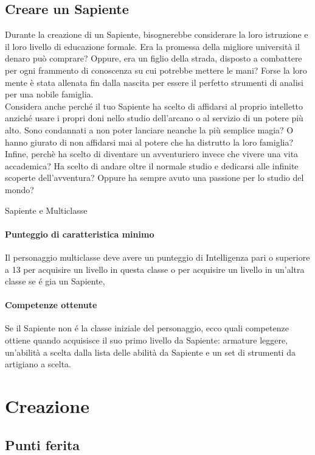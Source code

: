 \subsection{Creare un Sapiente}
Durante la creazione di un Sapiente, bisognerebbe considerare la loro istruzione e il loro livello di educazione formale. Era la promessa della migliore università il denaro può comprare? Oppure, era un figlio della strada, disposto a combattere per ogni frammento di conoscenza su cui potrebbe mettere le mani? Forse la loro mente è stata allenata fin dalla nascita per essere il perfetto strumenti di analisi per una nobile famiglia.\\
Considera anche perché il tuo Sapiente ha scelto di affidarsi al proprio intelletto anziché usare i propri doni nello studio dell'arcano o al servizio di un potere più alto. Sono condannati a non poter lanciare neanche la più semplice magia? O hanno giurato di non affidarsi mai al potere che ha distrutto la loro famiglia?\\
Infine, perchè ha scelto di diventare un avventuriero invece che vivere una vita accademica? Ha scelto di andare oltre il normale studio e dedicarsi alle infinite scoperte dell'avventura? Oppure ha sempre avuto una passione per lo studio del mondo?

\begin{DndSidebar}{Sapiente e Multiclasse}
\paragraph{Punteggio di caratteristica minimo} Il personaggio multiclasse deve avere un punteggio di Intelligenza pari o superiore a 13 per acquisire un livello in questa classe o per acquisire un livello in un'altra classe se é gia un Sapiente,
\paragraph{Competenze ottenute} Se il Sapiente non é la classe iniziale del personaggio, ecco quali competenze ottiene quando acquisisce il suo primo livello da Sapiente: armature leggere, un'abilità a scelta dalla lista delle abilità da Sapiente e un set di strumenti da artigiano a scelta.
\end{DndSidebar}

\section{Creazione}

\subsection{Punti ferita}
